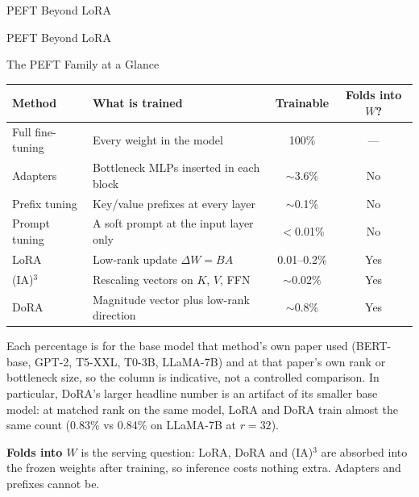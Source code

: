 \begin{frame}{PEFT Beyond LoRA}
  \begin{center}
    \Large
    PEFT Beyond LoRA
  \end{center}
\end{frame}

\begin{frame}[t]{The PEFT Family at a Glance}
  \begin{center}
    \scriptsize
    \renewcommand{\arraystretch}{1.35}
    \begin{tabular}{|l|>{\raggedright\arraybackslash}p{5.0cm}|c|c|}
      \hline
      \textbf{Method} & \textbf{What is trained} & \textbf{Trainable} & \textbf{Folds into $W$?} \\
      \hline
      Full fine-tuning & Every weight in the model & 100\% & --- \\
      Adapters & Bottleneck MLPs inserted in each block & $\sim$3.6\% & No \\
      Prefix tuning & Key/value prefixes at every layer & $\sim$0.1\% & No \\
      Prompt tuning & A soft prompt at the input layer only & $<$0.01\% & No \\
      LoRA & Low-rank update $\Delta W = BA$ & 0.01--0.2\% & Yes \\
      (IA)$^3$ & Rescaling vectors on $K$, $V$, FFN & $\sim$0.02\% & Yes \\
      DoRA & Magnitude vector plus low-rank direction & $\sim$0.8\% & Yes \\
      \hline
    \end{tabular}
  \end{center}
  \vspace{0.5em}
  {\scriptsize Each percentage is for the base model that method's own paper used (BERT-base, GPT-2, T5-XXL, T0-3B, LLaMA-7B) and at that paper's own rank or bottleneck size, so the column is indicative, not a controlled comparison. In particular, DoRA's larger headline number is an artifact of its smaller base model: at matched rank on the same model, LoRA and DoRA train almost the same count (0.83\% vs 0.84\% on LLaMA-7B at $r=32$).}

  \vspace{0.3em}
  {\scriptsize \textbf{Folds into $W$} is the serving question: LoRA, DoRA and (IA)$^3$ are absorbed into the frozen weights after training, so inference costs nothing extra. Adapters and prefixes cannot be.}
\end{frame}

